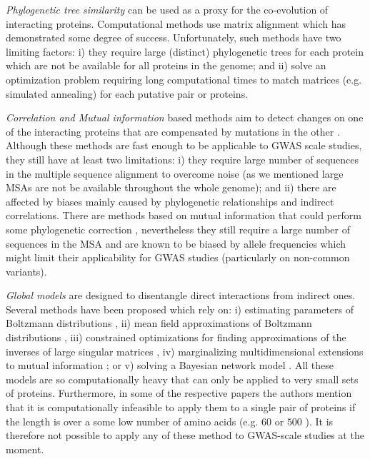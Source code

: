 \textit{Phylogenetic tree similarity} can be used as a proxy for the co-evolution of interacting proteins. 
Computational methods use matrix alignment \cite{ramani2003exploiting} which has demonstrated some degree of success. 
Unfortunately, such methods have two limiting factors: 
i) they require large (distinct) phylogenetic trees for each protein which are not be available for all proteins in the genome; and 
ii) solve an optimization problem requiring long computational times to match matrices (e.g. simulated annealing) for each putative pair or proteins.

\textit{Correlation and Mutual information} based methods aim to detect changes on one of the interacting proteins that are compensated by mutations in the other \cite{pazos1997correlated,gobel1994correlated}. 
Although these methods are fast enough to be applicable to GWAS scale studies, they still have at least two limitations: 
i) they require large number of sequences in the multiple sequence alignment to overcome noise (as we mentioned large MSAs are not be available throughout the whole genome); and 
ii) there are affected by biases mainly caused by phylogenetic relationships and indirect correlations. 
There are methods based on mutual information that could perform some phylogenetic correction \cite{de2013emerging}, nevertheless they still require a large number of sequences in the MSA and are known to be biased by allele frequencies \cite{dunn2008mutual} which might limit their applicability for GWAS studies (particularly on non-common variants).
    
\textit{Global models} are designed to disentangle direct interactions from indirect ones. 
Several methods have been proposed which rely on: 
i) estimating parameters of Boltzmann distributions \cite{lapedes2012using,weigt2009identification}, 
ii) mean field approximations of Boltzmann distributions \cite{morcos2011direct}, 
iii) constrained optimizations for finding approximations of the inverses of large singular matrices \cite{jones2012psicov}, 
iv) marginalizing multidimensional extensions to mutual information \cite{clark2014multidimensional}; or 
v) solving a Bayesian network model \cite{burger2010disentangling}. 
All these models are so computationally heavy that can only be applied to very small sets of proteins. 
Furthermore, in some of the respective papers the authors mention that it is computationally infeasible to apply them to a single pair of proteins if the length is over a some low number of amino acids (e.g. $60$ \cite{weigt2009identification} or $500$ \cite{morcos2011direct}). 
It is therefore not possible to apply any of these method to GWAS-scale studies at the moment.

